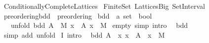 %
\begin{isabellebody}%
%
%
\isadelimdocument
%
\endisadelimdocument
%
\isatagdocument
%
\isamarkuptrue%
%
\endisatagdocument
{\isafolddocument}%
%
\isadelimdocument
%
\endisadelimdocument
%
\isadelimtheory
%
\endisadelimtheory
%
\isatagtheory
{}\isamarkupfalse%
\ Conditionally{\isacharunderscore}{\kern0pt}Complete{\isacharunderscore}{\kern0pt}Lattices\isanewline
{}\ Finite{\isacharunderscore}{\kern0pt}Set\ Lattices{\isacharunderscore}{\kern0pt}Big\ Set{\isacharunderscore}{\kern0pt}Interval\isanewline
{}%
\endisatagtheory
{\isafoldtheory}%
%
\isadelimtheory
\isanewline
%
\endisadelimtheory
\isanewline
{}\isamarkupfalse%
\ preordering{\isacharunderscore}{\kern0pt}bdd\ {\isacharequal}{\kern0pt}\ preordering\isanewline
{}\isanewline
\isanewline
{}\isamarkupfalse%
\ bdd\ {\isacharcolon}{\kern0pt}{\isacharcolon}{\kern0pt}\ {\isacartoucheopen}{\isacharprime}{\kern0pt}a\ set\ {\isasymRightarrow}\ bool{\isacartoucheclose}\isanewline
\ \ \ unfold{\isacharcolon}{\kern0pt}\ {\isacartoucheopen}bdd\ A\ {\isasymlongleftrightarrow}\ {\isacharparenleft}{\kern0pt}{\isasymexists}M{\isachardot}{\kern0pt}\ {\isasymforall}x\ {\isasymin}\ A{\isachardot}{\kern0pt}\ x\ \isactrlbold {\isasymle}\ M{\isacharparenright}{\kern0pt}{\isacartoucheclose}\isanewline
\isanewline
{}\isamarkupfalse%
\ empty\ {\isacharbrackleft}{\kern0pt}simp{\isacharcomma}{\kern0pt}\ intro{\isacharbrackright}{\kern0pt}{\isacharcolon}{\kern0pt}\isanewline
\ \ {\isacartoucheopen}bdd\ {\isacharbraceleft}{\kern0pt}{\isacharbraceright}{\kern0pt}{\isacartoucheclose}\isanewline
%
\isadelimproof
\ \ %
\endisadelimproof
%
\isatagproof
{}\isamarkupfalse%
\ {\isacharparenleft}{\kern0pt}simp\ add{\isacharcolon}{\kern0pt}\ unfold{\isacharparenright}{\kern0pt}%
\endisatagproof
{\isafoldproof}%
%
\isadelimproof
\isanewline
%
\endisadelimproof
\isanewline
{}\isamarkupfalse%
\ I\ {\isacharbrackleft}{\kern0pt}intro{\isacharbrackright}{\kern0pt}{\isacharcolon}{\kern0pt}\isanewline
\ \ {\isacartoucheopen}bdd\ A{\isacartoucheclose}\ \ {\isacartoucheopen}{\isasymAnd}x{\isachardot}{\kern0pt}\ x\ {\isasymin}\ A\ {\isasymLongrightarrow}\ x\ \isactrlbold {\isasymle}\ M{\isacartoucheclose}\isanewline
%
\isadelimproof
\ \ %
\endisadelimproof
%
\isatagproof

\end{isabellebody}
